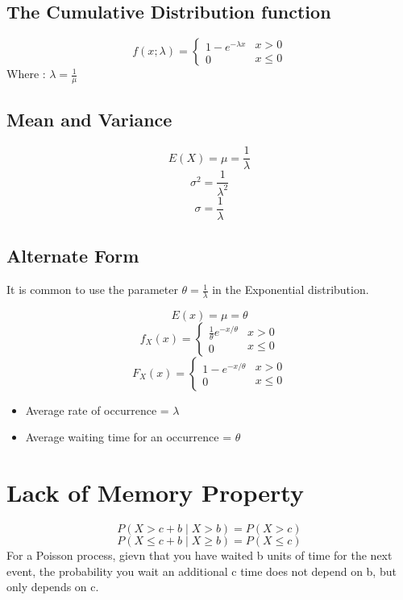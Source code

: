 \documentclass{article}
\newenvironment{cblock}[1]{%
    \tcolorbox[beamer,%
    noparskip,breakable,
    colback=lightblue,colframe=darkblue,%
    colbacklower=darkblue!75!lightblue,%
    title=#1]}%
    {\endtcolorbox}
\begin{document}
\subsection{The Cumulative Distribution function}
$$ f(x ; \lambda) = \begin{cases} 1- e^{-\lambda x} \\ 0 \end{cases} \begin{matrix}
x > 0 \\ x \leq 0 
\end{matrix} $$
Where : \(\lambda = \frac{1}{\mu}\)

\subsection{Mean and Variance}
$$ E(X) = \mu = \frac{1}{\lambda}$$
$$ \sigma^2 = \frac{1}{\lambda^2}$$
$$ \sigma = \frac{1}{\lambda}$$

\subsection{Alternate Form}
It is common to use the parameter \(\theta =  \frac{1}{\lambda}\) in the Exponential distribution.

$$E(x) = \mu = \theta $$
$$ f_X(x) = \begin{cases} \frac{1}{\theta} e^{-x/\theta} \\ 0 \end{cases} \begin{matrix}
x > 0 \\ x \leq 0 
\end{matrix} $$
$$ F_X(x) = \begin{cases} 1-  e^{-x/\theta} \\ 0 \end{cases} \begin{matrix}
x > 0 \\ x \leq 0 
\end{matrix} $$

\begin{cblock}{Note}
\begin{itemize}
\item Average rate of occurrence = \(\lambda\)
\item Average waiting time for an occurrence = \(\theta\)
\end{itemize}
\end{cblock}

\section{Lack of Memory Property}
$$ P(X > c + b \mid X > b ) = P(X > c) $$
$$ P(X \leq c + b \mid X \geq b ) = P(X \leq c) $$
For a  Poisson process, gievn that you have waited b units of time for the next event, the probability you wait an additional c time does not depend on b, but only depends on c.
\end{document}
